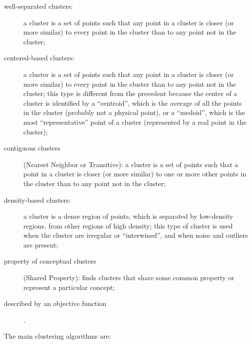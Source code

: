 \begin{description}
	\item[well-separated clusters:] a cluster is a set of points such that any point in a cluster is closer (or more similar) to every point in the cluster than to any point not in the cluster;
	\item[centered-based clusters:] a cluster is a set of points such that any point in a cluster is closer (or more similar) to every point in the cluster than to any point not in the cluster; this type is different from the precedent because the center of a cluster is identified by a ``centroid'', which is the average of all the points in the cluster (probably not a physical point), or a ``medoid'', which is the most ``representative'' point of a cluster (represented by a real point in the cluster);
	\item[contiguous clusters] (Nearest Neighbor or Transitive): a cluster is a set of points such that a point in a cluster is closer (or more similar) to one or more other points in the cluster than to any point not in the cluster;
	\item[density-based clusters:] a cluster is a dense region of points, which is separated by low-density regions, from other regions of high density; this type of cluster is used when the cluster are irregular or ``interwined'', and when noise and outliers are present;
	\item[property of conceptual clusters] (Shared Property): finds clusters that share some common property or represent a particular concept;
	\item[described by an objective function].
\end{description}

The main clustering algorithms are:
